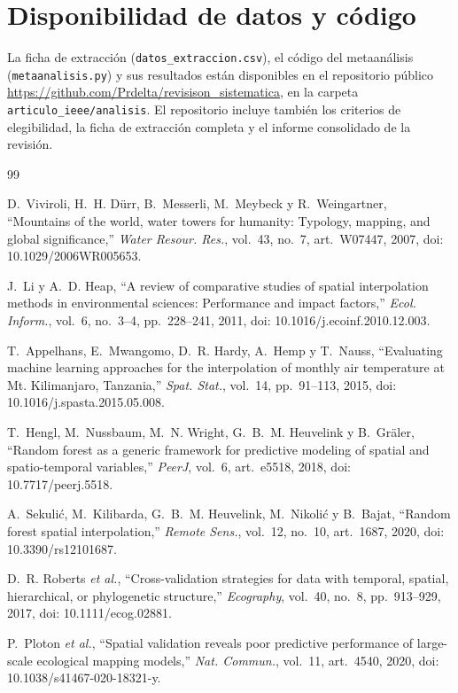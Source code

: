 \documentclass[conference]{IEEEtran}
\begin{document}
\section*{Disponibilidad de datos y código}
La ficha de extracción (\texttt{datos\_extraccion.csv}), el código del metaanálisis (\texttt{metaanalisis.py}) y sus resultados están disponibles en el repositorio público \url{https://github.com/Prdelta/revisison_sistematica}, en la carpeta \texttt{articulo\_ieee/analisis}. El repositorio incluye también los criterios de elegibilidad, la ficha de extracción completa y el informe consolidado de la revisión.

\begin{thebibliography}{99}

D.~Viviroli, H.~H. Dürr, B.~Messerli, M.~Meybeck y R.~Weingartner, ``Mountains of the world, water towers for humanity: Typology, mapping, and global significance,'' \textit{Water Resour. Res.}, vol.~43, no.~7, art.~W07447, 2007, doi: 10.1029/2006WR005653.

J.~Li y A.~D. Heap, ``A review of comparative studies of spatial interpolation methods in environmental sciences: Performance and impact factors,'' \textit{Ecol. Inform.}, vol.~6, no.~3--4, pp.~228--241, 2011, doi: 10.1016/j.ecoinf.2010.12.003.

T.~Appelhans, E.~Mwangomo, D.~R. Hardy, A.~Hemp y T.~Nauss, ``Evaluating machine learning approaches for the interpolation of monthly air temperature at Mt. Kilimanjaro, Tanzania,'' \textit{Spat. Stat.}, vol.~14, pp.~91--113, 2015, doi: 10.1016/j.spasta.2015.05.008.

T.~Hengl, M.~Nussbaum, M.~N. Wright, G.~B.~M. Heuvelink y B.~Gräler, ``Random forest as a generic framework for predictive modeling of spatial and spatio-temporal variables,'' \textit{PeerJ}, vol.~6, art.~e5518, 2018, doi: 10.7717/peerj.5518.

A.~Sekulić, M.~Kilibarda, G.~B.~M. Heuvelink, M.~Nikolić y B.~Bajat, ``Random forest spatial interpolation,'' \textit{Remote Sens.}, vol.~12, no.~10, art.~1687, 2020, doi: 10.3390/rs12101687.

D.~R. Roberts \textit{et al.}, ``Cross-validation strategies for data with temporal, spatial, hierarchical, or phylogenetic structure,'' \textit{Ecography}, vol.~40, no.~8, pp.~913--929, 2017, doi: 10.1111/ecog.02881.

P.~Ploton \textit{et al.}, ``Spatial validation reveals poor predictive performance of large-scale ecological mapping models,'' \textit{Nat. Commun.}, vol.~11, art.~4540, 2020, doi: 10.1038/s41467-020-18321-y.


\end{thebibliography}
\end{document}
